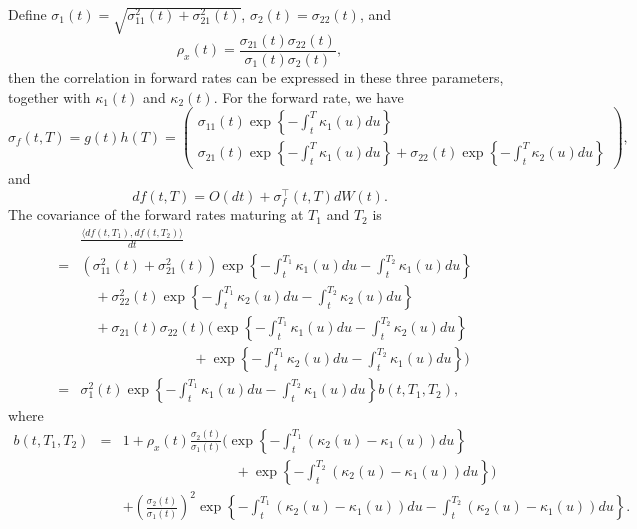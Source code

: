 \documentclass[12pt]{article}
\begin{document}
  Define
  $\sigma_1(t)=\sqrt{\sigma_{11}^2(t)+\sigma_{21}^2(t)}$, $\sigma_2(t)=\sigma_{22}(t)$, and
  \begin{equation}
    \rho_x(t)=\frac{\sigma_{21}(t)\sigma_{22}(t)}{\sigma_1(t)\sigma_2(t)},
  \end{equation}
  then the correlation in forward rates can be expressed in these three parameters, together with $\kappa_1(t)$
  and $\kappa_2(t)$. For the forward rate, we have
  \begin{equation}
    \sigma_f(t,T)=g(t)h(T)=\left(
            \begin{array}{l}
              \sigma_{11}(t)\exp\left\{-\int_t^T\kappa_1(u)du\right\}\\
              \sigma_{21}(t)\exp\left\{-\int_t^T\kappa_1(u)du\right\}+\sigma_{22}(t)\exp\left\{-\int_t^T\kappa_2(u)du\right\}
            \end{array}
         \right),
  \end{equation}
  and
  \begin{equation}
    df(t,T)=O(dt)+\sigma_f^{{\top}}(t,T)dW(t).
  \end{equation}
  The covariance of the forward rates maturing at $T_1$ and $T_2$ is
  \begin{eqnarray}
    && \frac{\langle df(t,T_1), df(t,T_2)\rangle}{dt} \nonumber\\
    &=& \left(\sigma_{11}^2(t)+\sigma_{21}^2(t)\right)\exp\left\{-\int_t^{T_1}\kappa_1(u)du-\int_t^{T_2}\kappa_1(u)du\right\}\nonumber\\
    && \quad +\sigma_{22}^2(t)\exp\left\{-\int_t^{T_1}\kappa_2(u)du-\int_t^{T_2}\kappa_2(u)du\right\}\nonumber\\
    && \quad +\sigma_{21}(t)\sigma_{22}(t)\Bigg(\exp\left\{-\int_t^{T_1}\kappa_1(u)du-\int_t^{T_2}\kappa_2(u)du\right\} \nonumber\\
    && \quad\quad\quad\quad\quad\quad\quad\quad +\exp\left\{-\int_t^{T_1}\kappa_2(u)du-\int_t^{T_2}\kappa_1(u)du\right\}\Bigg)\nonumber\\
    &=& \sigma_1^2(t)\exp\left\{-\int_t^{T_1}\kappa_1(u)du-\int_t^{T_2}\kappa_1(u)du\right\}b(t,T_1,T_2),
  \end{eqnarray}
  where
  \begin{eqnarray}
    b(t,T_1,T_2)&=&1+\rho_x(t)\frac{\sigma_2(t)}{\sigma_1(t)}\Bigg(\exp\left\{-\int_t^{T_1}\left(\kappa_2(u)-\kappa_1(u)\right)du\right\}\nonumber\\
                && \quad\quad\quad\quad\quad\quad\quad\quad +\exp\left\{-\int_t^{T_2}\left(\kappa_2(u)-\kappa_1(u)\right)du\right\}\Bigg)\nonumber\\
                && +\left(\frac{\sigma_2(t)}{\sigma_1(t)}\right)^2\exp\left\{-\int_t^{T_1}\left(\kappa_2(u)-\kappa_1(u)\right)du
                                                                            -\int_t^{T_2}\left(\kappa_2(u)-\kappa_1(u)\right)du\right\}.
  \end{eqnarray}
\end{document}
